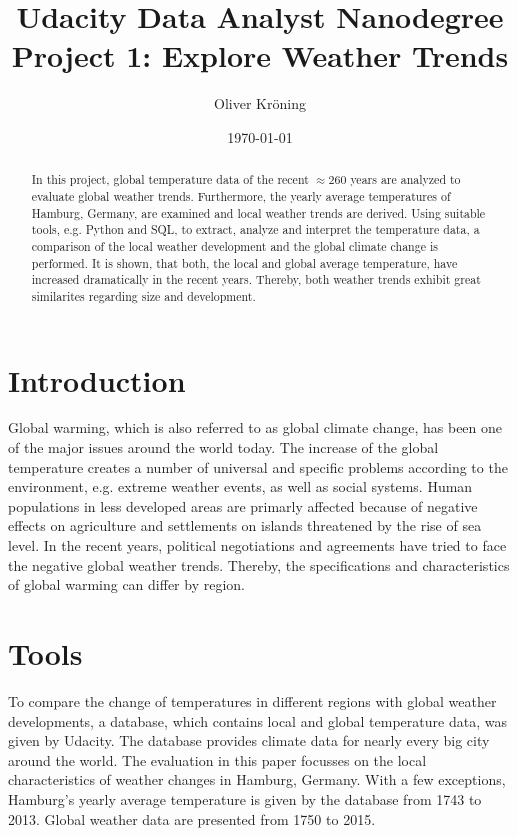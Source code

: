 \documentclass[a4paper]{article}
\title{Udacity Data Analyst Nanodegree Project 1: Explore Weather Trends }
\author{Oliver Kr\"{o}ning}
\date{\today}
\begin{document}
\maketitle

\begin{abstract}
In this project, global temperature data of the recent $\approx 260$ years are analyzed to evaluate global weather trends. Furthermore, the yearly average temperatures of Hamburg, Germany, are examined and local weather trends are derived. Using suitable tools, e.g. Python and SQL, to extract, analyze and interpret the temperature data, a comparison of the local weather development and the global climate change is performed. It is shown, that both, the local and global average temperature, have increased dramatically in the recent years. Thereby, both weather trends exhibit great similarites regarding size and development.  
\end{abstract}

\section{Introduction}
\label{sec:introduction}

Global warming, which is also referred to as global climate change, has been one of the major issues around the world today. The increase of the global temperature creates a number of universal and specific problems according to the environment, e.g. extreme weather events, as well as social systems. Human populations in less developed areas are primarly affected because of negative effects on agriculture and settlements on islands threatened by the rise of sea level. In the recent years, political negotiations and agreements have tried to face the negative global weather trends. Thereby, the specifications and characteristics of global warming can differ by region.
  
\section{Tools}
\label{sec:tool}
To compare the change of temperatures in different regions with global weather developments, a database, which contains local and global temperature data, was given by Udacity. The database provides climate data for nearly every big city around the world. The evaluation in this paper focusses on the local characteristics of weather changes in Hamburg, Germany. With a few exceptions, Hamburg's yearly average temperature is given by the database from 1743 to 2013. Global weather data are presented from 1750 to 2015.
\end{document}
